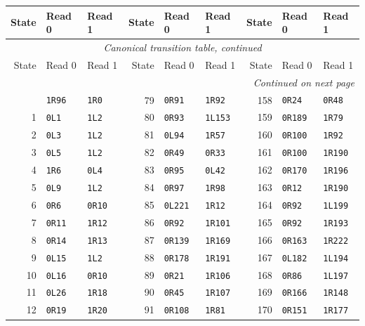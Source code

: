 \begingroup\small
\setlength{\tabcolsep}{7pt}
\begin{longtable}{rll@{\qquad}rll@{\qquad}rll}
\toprule
State & Read 0 & Read 1 & State & Read 0 & Read 1 & State & Read 0 & Read 1\\
\midrule
\endfirsthead
\multicolumn{9}{c}{\emph{Canonical transition table, continued}}\\
\toprule
State & Read 0 & Read 1 & State & Read 0 & Read 1 & State & Read 0 & Read 1\\
\midrule
\endhead
\midrule\multicolumn{9}{r}{\emph{Continued on next page}}\\
\endfoot
\bottomrule
\endlastfoot
0 & \texttt{1R96} & \texttt{1R0} & 79 & \texttt{0R91} & \texttt{1R92} & 158 & \texttt{0R24} & \texttt{0R48}\\
1 & \texttt{0L1} & \texttt{1L2} & 80 & \texttt{0R93} & \texttt{1L153} & 159 & \texttt{0R189} & \texttt{1R79}\\
2 & \texttt{0L3} & \texttt{1L2} & 81 & \texttt{0L94} & \texttt{1R57} & 160 & \texttt{0R100} & \texttt{1R92}\\
3 & \texttt{0L5} & \texttt{1L2} & 82 & \texttt{0R49} & \texttt{0R33} & 161 & \texttt{0R100} & \texttt{1R190}\\
4 & \texttt{1R6} & \texttt{0L4} & 83 & \texttt{0R95} & \texttt{0L42} & 162 & \texttt{0R170} & \texttt{1R196}\\
5 & \texttt{0L9} & \texttt{1L2} & 84 & \texttt{0R97} & \texttt{1R98} & 163 & \texttt{0R12} & \texttt{1R190}\\
6 & \texttt{0R6} & \texttt{0R10} & 85 & \texttt{0L221} & \texttt{1R12} & 164 & \texttt{0R92} & \texttt{1L199}\\
7 & \texttt{0R11} & \texttt{1R12} & 86 & \texttt{0R92} & \texttt{1R101} & 165 & \texttt{0R92} & \texttt{1R193}\\
8 & \texttt{0R14} & \texttt{1R13} & 87 & \texttt{0R139} & \texttt{1R169} & 166 & \texttt{0R163} & \texttt{1R222}\\
9 & \texttt{0L15} & \texttt{1L2} & 88 & \texttt{0R178} & \texttt{1R191} & 167 & \texttt{0L182} & \texttt{1L194}\\
10 & \texttt{0L16} & \texttt{0R10} & 89 & \texttt{0R21} & \texttt{1R106} & 168 & \texttt{0R86} & \texttt{1L197}\\
11 & \texttt{0L26} & \texttt{1R18} & 90 & \texttt{0R45} & \texttt{1R107} & 169 & \texttt{0R166} & \texttt{1R148}\\
12 & \texttt{0R19} & \texttt{1R20} & 91 & \texttt{0R108} & \texttt{1R81} & 170 & \texttt{0R151} & \texttt{1R177}\\

\end{longtable}
